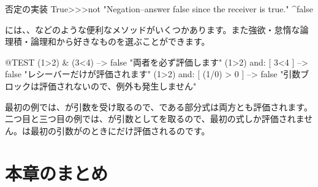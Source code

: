 \documentclass[a4paper,10pt,twoside]{book}
\begin{document}
\begin{method}{否定の実装}
True>>>not
    "Negation--answer false since the receiver is true."
    ^false
\end{method}

には、、などのような便利なメソッドがいくつかあります。また強欲・怠惰な論理積・論理和から好きなものを選ぶことができます。

\begin{code}{@TEST}
(1>2) & (3<4)              --> false    "両者を必ず評価します"
(1>2) and: [ 3<4 ]        --> false    "レシーバーだけが評価されます"
(1>2) and: [ (1/0) > 0 ] --> false    "引数ブロックは評価されないので、例外も発生しません"
\end{code}

最初の例では、が引数を受け取るので、である部分式は両方とも評価されます。
二つ目と三つ目の例では、が引数としてを取るので、最初の式しか評価されません。は最初の引数がのときにだけ評価されるのです。


\section{本章のまとめ}
\end{document}
